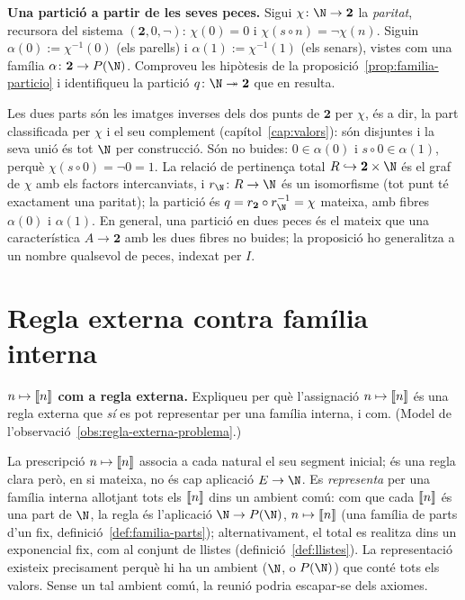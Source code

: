 \begin{exercici}
\textbf{Una partició a partir de les seves peces.} Sigui \(\chi\colon\N\to\mathbf2\) la \emph{paritat}, recursora del sistema \((\mathbf2,0,\neg)\): \(\chi(0)=0\) i \(\chi(s\circ n)=\neg\chi(n)\). Siguin \(\alpha(0):=\chi^{-1}(0)\) (els parells) i \(\alpha(1):=\chi^{-1}(1)\) (els senars), vistes com una família \(\alpha\colon\mathbf2\to P(\N)\). Comproveu les hipòtesis de la proposició~\ref{prop:familia-particio} i identifiqueu la partició \(q\colon\N\twoheadrightarrow\mathbf2\) que en resulta.
\end{exercici}
\begin{solucio}
Les dues parts són les imatges inverses dels dos punts de \(\mathbf2\) per \(\chi\), és a dir, la part classificada per \(\chi\) i el seu complement (capítol~\ref{cap:valors}): són disjuntes i la seva unió és tot \(\N\) per construcció. Són no buides: \(0\in\alpha(0)\) i \(s\circ0\in\alpha(1)\), perquè \(\chi(s\circ0)=\neg0=1\). La relació de pertinença total \(R\hookrightarrow\mathbf2\times\N\) és el graf de \(\chi\) amb els factors intercanviats, i \(r_\N\colon R\to\N\) és un isomorfisme (tot punt té exactament una paritat); la partició és \(q=r_{\mathbf2}\circ r_\N^{-1}=\chi\) mateixa, amb fibres \(\alpha(0)\) i \(\alpha(1)\). En general, una partició en dues peces és el mateix que una característica \(A\to\mathbf2\) amb les dues fibres no buides; la proposició ho generalitza a un nombre qualsevol de peces, indexat per \(I\).
\end{solucio}

\section{Regla externa contra família interna}\label{prac:regla-vs-familia}

\begin{exercici}
\textbf{\(n\mapsto\llbracket n\rrbracket\) com a regla externa.} Expliqueu per què l'assignació \(n\mapsto\llbracket n\rrbracket\) és una regla externa que \emph{sí} es pot representar per una família interna, i com. (Model de l'observació~\ref{obs:regla-externa-problema}.)
\end{exercici}
\begin{solucio}
La prescripció \(n\mapsto\llbracket n\rrbracket\) associa a cada natural el seu segment inicial; és una regla clara però, en si mateixa, no és cap aplicació \(E\to\N\). Es \emph{representa} per una família interna allotjant tots els \(\llbracket n\rrbracket\) dins un ambient comú: com que cada \(\llbracket n\rrbracket\) és una part de \(\N\), la regla és l'aplicació \(\N\to P(\N)\), \(n\mapsto\llbracket n\rrbracket\) (una família de parts d'un fix, definició~\ref{def:familia-parts}); alternativament, el total es realitza dins un exponencial fix, com al conjunt de llistes (definició~\ref{def:llistes}). La representació existeix precisament perquè hi ha un ambient (\(\N\), o \(P(\N)\)) que conté tots els valors. Sense un tal ambient comú, la reunió podria escapar-se dels axiomes.
\end{solucio}


